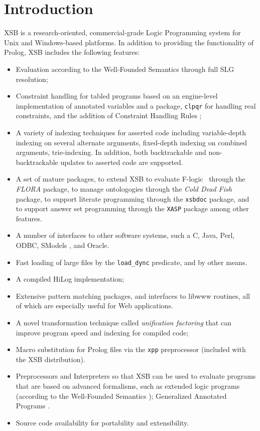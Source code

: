 \chapter{Introduction} \label{introduction}

XSB is a research-oriented, commercial-grade Logic Programming system
for Unix and Windows-based platforms.  In addition to providing 
the functionality of Prolog, XSB includes the following features: 
\begin{itemize}
\item Evaluation according to the Well-Founded Semantics \cite{VGRS91}
  through full SLG resolution;
\item Constraint handling for tabled programs based on an engine-level
  implementation of annotated variables and a package, {\tt clpqr} for
  handling real constraints, and the addition of Constraint Handling
  Rules \cite{};
\item A variety of indexing techniques for asserted code 
including variable-depth indexing on several alternate arguments,
fixed-depth indexing on combined arguments, trie-indexing.  In
addition, both backtrackable and non-backtrackable updates to asserted
code are supported.
%
\item A set of mature packages, to extend XSB to evaluate
F-logic~\cite{KLW95} through the {\em FLORA} package, to manage
ontologogies through the {\em Cold Dead Fish} package, to support
literate programming through the {\tt xsbdoc} package, and to support
answer set programming through the {\tt XASP} package among other
features.
%
\item A number of interfaces to other software systems, such a C, Java,
  Perl, ODBC, SModels \cite{NiSi97}, and Oracle.
%
\item Fast loading of large files by the {\tt load\_dync}
predicate, and by other means.
%
\item A compiled HiLog implementation;
%
\item Extensive pattern matching packages, and interfaces to libwww
  routines, all of which are especially useful for Web applications.
%
\item A novel transformation technique called {\em unification
factoring} that can improve program speed and indexing for compiled
code; 
%
\item Macro substitution for Prolog files via the {\tt xpp}
preprocessor (included with the XSB distribution).
%
\item Preprocessors and Interpreters so that XSB can be used to evaluate
  programs that are based on advanced formalisms, such as extended logic
  programs (according to the Well-Founded Semantics \cite{ADP94});
Generalized Annotated Programs \cite{KiSu92}.
%
\item Source code availability for portability and extensibility.
\end{itemize}
 
